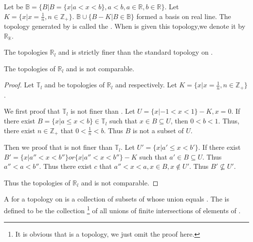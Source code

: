       \begin{definition}\label{def:KTopologyOnTheRealLine}
            Let be $ \mathbb{B} = \{ B | B = \{ x | a < x < b \}, a < b, a \in \mathbb{R}, b \in \mathbb{R} \} $. Let $ K = \{ x | x = \frac{1}{n}, n \in \mathbb{Z_{+}} \} $. $ \mathbb{B} \cup \{ B - K | B \in \mathbb{B} \} $ formed a basis on real line. The topology generated by  is called the . When  is given this topology,we denote it by $ \mathbb{R_{K}} $.
      \end{definition}

      \begin{lemma} \omitObviuos
            The topologies $ \mathbb{R}_{l} $ and  is strictly finer than the standard topology on .
      \end{lemma}

      \begin{lemma}
            The topologies of $ \mathbb{R}_{l} $ and  is not comparable.
      \end{lemma}

      \begin{proof}
            Let $ \mathbb{T}_{l} $ and  be topologies of $ \mathbb{R}_{l} $ and  respectively. Let $ K = \{ x | x = \frac{1}{n}, n \in \mathbb{Z_{+}} \} $.

            We first proof that $ \mathbb{T}_{l} $ is not finer than . Let $ U = \{ x | -1 < x < 1 \} - K, x = 0 $.
            If there exist $ B = \{ x | a \le x < b \} \in \mathbb{T}_{l} $ such that $ x \in B \subseteq U $, then $ 0 < b < 1 $. Thus, there exist $ n \in \mathbb{Z_{+}} $ that $ 0 < \frac{1}{n} < b $. Thus $ B $ is not a subset of $ U $.

            Then we proof that  is not finer than $ \mathbb{T}_{l} $. Let $ U' = \{ x | a' \le x < b' \} $.
            If there exist $ B' = \{ x | a'' < x < b'' \} or \{ x | a'' < x < b'' \} - K $ such that $ {a'} \in B \subseteq U $.
            Thus $ a'' < a < b'' $.
            Thus there exist $ c $ that $ a'' < x < a, x \in B ,x \notin U' $. Thus $ B' \nsubseteq U' $.

            Thus the topologies of $ \mathbb{R}_{l} $ and  is not comparable.
      \end{proof}

      \begin{definition}[subbasis]\label{def:Subbasis}
            A   for a topology on  is a collection of subsets of  whose union equals . The   is defined to be the collection  \footnote{
                  It is obvious that  is a topology, we just omit the proof here.
            } of all unions of finite intersections of elements of .
      \end{definition}
